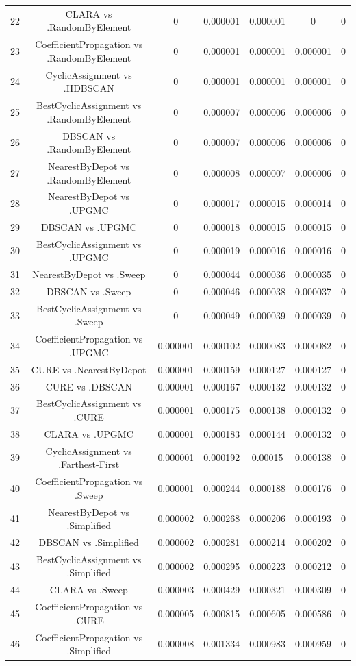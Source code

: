 \documentclass[a4paper,10pt]{article}
\begin{document}
\begin{landscape}
\begin{table}[!htp]
\begin{tabular}{ccccccc}
22&CLARA vs .RandomByElement&0&0.000001&0.000001&0&0\\
23&CoefficientPropagation vs .RandomByElement&0&0.000001&0.000001&0.000001&0\\
24&CyclicAssignment vs .HDBSCAN&0&0.000001&0.000001&0.000001&0\\
25&BestCyclicAssignment vs .RandomByElement&0&0.000007&0.000006&0.000006&0\\
26&DBSCAN vs .RandomByElement&0&0.000007&0.000006&0.000006&0\\
27&NearestByDepot vs .RandomByElement&0&0.000008&0.000007&0.000006&0\\
28&NearestByDepot vs .UPGMC&0&0.000017&0.000015&0.000014&0\\
29&DBSCAN vs .UPGMC&0&0.000018&0.000015&0.000015&0\\
30&BestCyclicAssignment vs .UPGMC&0&0.000019&0.000016&0.000016&0\\
31&NearestByDepot vs .Sweep&0&0.000044&0.000036&0.000035&0\\
32&DBSCAN vs .Sweep&0&0.000046&0.000038&0.000037&0\\
33&BestCyclicAssignment vs .Sweep&0&0.000049&0.000039&0.000039&0\\
34&CoefficientPropagation vs .UPGMC&0.000001&0.000102&0.000083&0.000082&0\\
35&CURE vs .NearestByDepot&0.000001&0.000159&0.000127&0.000127&0\\
36&CURE vs .DBSCAN&0.000001&0.000167&0.000132&0.000132&0\\
37&BestCyclicAssignment vs .CURE&0.000001&0.000175&0.000138&0.000132&0\\
38&CLARA vs .UPGMC&0.000001&0.000183&0.000144&0.000132&0\\
39&CyclicAssignment vs .Farthest-First&0.000001&0.000192&0.00015&0.000138&0\\
40&CoefficientPropagation vs .Sweep&0.000001&0.000244&0.000188&0.000176&0\\
41&NearestByDepot vs .Simplified&0.000002&0.000268&0.000206&0.000193&0\\
42&DBSCAN vs .Simplified&0.000002&0.000281&0.000214&0.000202&0\\
43&BestCyclicAssignment vs .Simplified&0.000002&0.000295&0.000223&0.000212&0\\
44&CLARA vs .Sweep&0.000003&0.000429&0.000321&0.000309&0\\
45&CoefficientPropagation vs .CURE&0.000005&0.000815&0.000605&0.000586&0\\
46&CoefficientPropagation vs .Simplified&0.000008&0.001334&0.000983&0.000959&0\\

\end{tabular}
\end{table}
\end{landscape}
\end{document}
